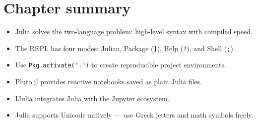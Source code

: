 \section{Chapter summary}

\begin{itemize}
  \item Julia solves the two-language problem: high-level syntax with compiled speed.
  \item The REPL has four modes: Julian, Package (\texttt{]}), Help (\texttt{?}), and Shell (\texttt{;}).
  \item Use \texttt{Pkg.activate(".")} to create reproducible project environments.
  \item Pluto.jl provides reactive notebooks saved as plain Julia files.
  \item IJulia integrates Julia with the Jupyter ecosystem.
  \item Julia supports Unicode natively --- use Greek letters and math symbols freely.
\end{itemize}
